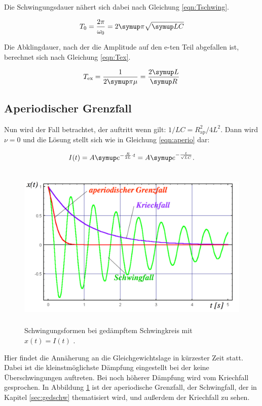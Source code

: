 Die Schwingungsdauer nähert sich dabei nach Gleichung \eqref{eqn:Tschwing}.

\begin{equation}
  T_{\text{0}} = \frac{2 \pi}{\omega_0} = 2 \g{\pi}\sqrt{\g{LC}}
  \label{eqn:Tschwing}
\end{equation}

Die Abklingdauer, nach der die Amplitude auf den e-ten Teil abgefallen ist,
berechnet sich nach Gleichung \eqref{eqn:Tex}.

\begin{equation}
  T_{\text{ex}} = \frac{1}{2\g{\pi}\mu} = \frac{2\g{L}}{\g{R}}
  \label{eqn:Tex}
\end{equation}

\subsection{Aperiodischer Grenzfall}

Nun wird der Fall betrachtet, der auftritt wenn gilt:
$1/LC = R_{\text{ap}}^2/4L^2$. Dann wird $\nu = 0$ und die Lösung stellt
sich wie in Gleichung \eqref{eqn:aperio} dar:

\begin{equation}
  I(t) = A \g{e}^{-\frac{R}{2L}\cdot t} = A \g{e}^{-\frac{t}{\sqrt{LC}}}.
  \label{eqn:aperio}
\end{equation}

\begin{figure}[h]
  \centering
  \includegraphics[height = 8cm]{aperio.pdf}
  \caption{Schwingungsformen bei gedämpftem Schwingkreis mit $x(t) = I(t)$ \cite{weis}.}
  \label{fig:aperio}
\end{figure}

Hier findet die Annäherung an die Gleichgewichtslage in kürzester Zeit statt.
Dabei ist die kleinstmöglichste Dämpfung eingestellt bei der keine Überschwingungen
auftreten. Bei noch höherer Dämpfung wird vom Kriechfall gesprochen.
In Abbildung \ref{fig:aperio} ist der aperiodische Grenzfall, der
Schwingfall, der in Kapitel \ref{sec:gedschw} thematisiert wird, und
außerdem der Kriechfall zu sehen.

